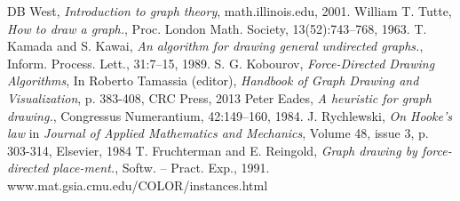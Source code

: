 \documentclass[a4paper,12pt]{article}
\begin{document}
\begin{thebibliography}{99}
DB West, \emph{Introduction to graph theory}, math.illinois.edu, 2001.
William T. Tutte, \emph{How to draw a graph.}, Proc. London Math. Society, 13(52):743–768, 1963.
T. Kamada and S. Kawai, \emph{An algorithm for drawing general undirected graphs.}, Inform. Process. Lett., 31:7–15, 1989.
S. G. Kobourov, \emph{Force-Directed Drawing Algorithms}, In Roberto Tamassia (editor), \emph{Handbook of Graph Drawing and Visualization}, p. 383-408, CRC Press, 2013
 Peter Eades, \emph{A heuristic for graph drawing.}, Congressus Numerantium, 42:149–160, 1984.
 J. Rychlewski, \emph{On Hooke's law} in \emph{Journal of Applied Mathematics and Mechanics}, Volume 48, issue 3, p. 303-314, Elsevier, 1984
T. Fruchterman and E. Reingold, \emph{Graph drawing by force-directed place-ment.}, Softw. – Pract. Exp., 1991.
 www.mat.gsia.cmu.edu/COLOR/instances.html
\end{thebibliography}
\end{document}
